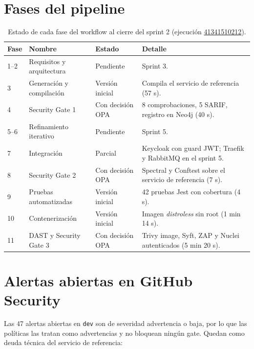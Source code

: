 \documentclass[11pt,a4paper]{report}
\newcommand{\run}[1]{\href{https://github.com/PracticasESPE/Framework_Desarrollo_Seguro/actions/runs/#1}{#1}}
\begin{document}
\section{Fases del pipeline}

\begin{table}[H]
\centering
\caption{Estado de cada fase del workflow al cierre del sprint 2 (ejecución \run{41341510212}).}
\begin{tabularx}{\textwidth}{@{}P{0.9cm}P{4.0cm}P{2.6cm}L@{}}
\toprule
\textbf{Fase} & \textbf{Nombre} & \textbf{Estado} & \textbf{Detalle}\\
--2 & Requisitos y arquitectura & Pendiente & Sprint 3.\\
3 & Generación y compilación & Versión inicial & Compila el servicio de referencia (57 s).\\
4 & Security Gate 1 & Con decisión OPA & 8 comprobaciones, 5 SARIF, registro en Neo4j (40 s).\\
5--6 & Refinamiento iterativo & Pendiente & Sprint 5.\\
7 & Integración & Parcial & Keycloak con guard JWT; Traefik y RabbitMQ en el sprint 5.\\
8 & Security Gate 2 & Con decisión OPA & Spectral y Conftest sobre el servicio de referencia (7 s).\\
9 & Pruebas automatizadas & Versión inicial & 42 pruebas Jest con cobertura (4 s).\\
10 & Contenerización & Versión inicial & Imagen \emph{distroless} sin root (1 min 14 s).\\
11 & DAST y Security Gate 3 & Con decisión OPA & Trivy image, Syft, ZAP y Nuclei autenticados (5 min 20 s).\\
\bottomrule
\end{tabularx}
\end{table}

\section{Alertas abiertas en GitHub Security}

Las 47 alertas abiertas en \texttt{dev} son de severidad advertencia o baja, por lo que las
políticas las tratan como advertencias y no bloquean ningún gate. Quedan como deuda técnica del
servicio de referencia:
\end{document}
